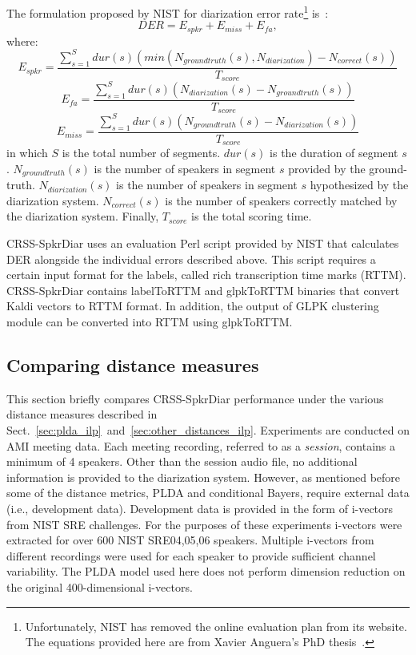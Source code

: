 The formulation proposed by NIST for diarization error rate\footnote{Unfortunately, NIST has removed the online evaluation plan from its website. The equations provided here are from Xavier Anguera's PhD thesis~\cite{anguera2007phd}.} is~\cite{anguera2012DRZreview}:
\begin{equation}
DER = E_{spkr} + E_{miss} + E_{fa}, 
\end{equation}
where: 
\begin{equation}
E_{spkr} = \frac{\sum\limits_{s=1}^{S} dur(s)(min(N_{groundtruth}(s),N_{diarization})-N_{correct}(s))}{T_{score}}
\end{equation}
\begin{equation}
E_{fa} = \frac{\sum\limits_{s=1}^S dur(s)(N_{diarization}(s)-N_{groundtruth}(s))}{T_{score}}
\end{equation}
\begin{equation}
E_{miss} = \frac{\sum\limits_{s=1}^S dur(s)(N_{groundtruth}(s) - N_{diarization}(s))}{T_{score}}
\end{equation}
in which $S$ is the total number of segments. $dur(s)$ is the duration of segment $s$. $N_{groundtruth}(s)$ is the number of speakers in segment $s$ provided by the ground-truth. 
$N_{diarization}(s)$ is the number of speakers in segment $s$ hypothesized by the diarization system. 
$N_{correct}(s)$ is the number of speakers correctly matched by the diarization system. 
Finally, $T_{score}$ is the total scoring time. 

CRSS-SpkrDiar uses an evaluation Perl script provided by NIST that calculates DER alongside the individual errors described above. 
This script requires a certain input format for the labels, called rich transcription time marks (RTTM). 
CRSS-SpkrDiar contains labelToRTTM and glpkToRTTM binaries that convert Kaldi vectors to RTTM format. 
In addition, the output of GLPK clustering module can be converted into RTTM using glpkToRTTM. 

\subsection{Comparing distance measures}
This section briefly compares CRSS-SpkrDiar performance under the various distance measures described in Sect.~\ref{sec:plda_ilp}~and~\ref{sec:other_distances_ilp}. 
Experiments are conducted on AMI meeting data. 
Each meeting recording, referred to as a {\it session}, contains a minimum of 4 speakers. 
Other than the session audio file, no additional information is provided to the diarization system. 
However, as mentioned before some of the distance metrics, PLDA and conditional Bayers, require external data (i.e., development data). 
Development data is provided in the form of i-vectors from NIST SRE challenges. 
For the purposes of these experiments i-vectors were extracted for over 600 NIST SRE04,05,06 speakers. 
Multiple i-vectors from different recordings were used for each speaker to provide sufficient channel variability. 
The PLDA model used here does not perform dimension reduction on the original 400-dimensional i-vectors. 

